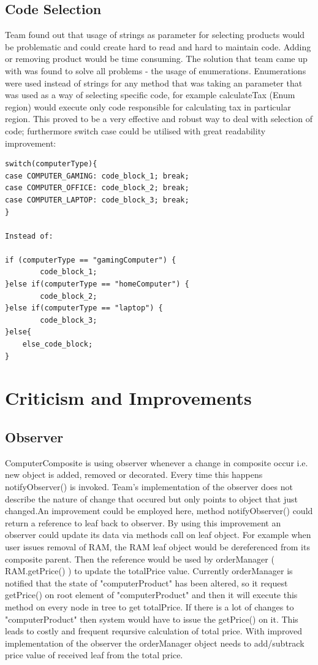 \documentclass[pdftex,11pt,a4paper]{article}
\begin{document}
\subsection{Code Selection}
Team found out that usage of strings as parameter for selecting products would be problematic and could create hard to read and hard to maintain code. Adding or removing product would be time consuming. The solution that team came up with was found to solve all problems - the usage of enumerations. Enumerations were used instead of strings for any method that was taking an parameter that was used as a way of selecting specific code, for example calculateTax (Enum region) would execute only code responsible for calculating tax in particular region. This proved to be a very effective and robust way to deal with selection of code; furthermore switch case could be utilised with great readability improvement:

\begin{verbatim}
switch(computerType){
case COMPUTER_GAMING: code_block_1; break;	
case COMPUTER_OFFICE: code_block_2; break;
case COMPUTER_LAPTOP: code_block_3; break;
}

Instead of:
	
if (computerType == "gamingComputer") {
		code_block_1;
}else if(computerType == "homeComputer") {
		code_block_2;
}else if(computerType == "laptop") {
		code_block_3;
}else{
	else_code_block;
}
\end{verbatim}
\pagebreak

\section{Criticism and Improvements}
\subsection{Observer}
ComputerComposite is using observer whenever a change in composite occur i.e. new object is added,  removed or decorated. Every time this happens notifyObserver() is invoked. Team's implementation of the observer does not describe the nature of change that occured but only points to object that just changed.An improvement could be employed here, method notifyObserver() could return a reference to leaf back to observer. By using this improvement an observer could update its data via methods call on leaf object. For example when user issues removal of RAM, the RAM leaf object would be dereferenced from its composite parent. Then the reference would be used by orderManager ( RAM.getPrice() ) to update the totalPrice value.
Currently orderManager is notified that the state of "computerProduct" has been altered, so it request getPrice() on root element of "computerProduct" and then it will execute this method on every node in tree to get totalPrice.
If there is a lot of changes to "computerProduct" then system would have to issue the getPrice() on it. This leads to costly and frequent reqursive calculation of total price. With improved implementation of the observer the orderManager object needs to add/subtrack price value of received leaf from the total price.
\end{document}

